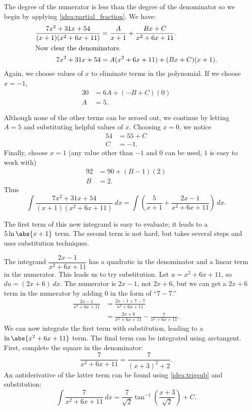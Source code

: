 {The degree of the numerator is less than the degree of the denominator so we begin by applying \autoref{idea:partial_fraction}. We have:
\begin{align*}
\frac{7x^2+31x+54}{(x+1)(x^2+6x+11)} &= \frac{A}{x+1} + \frac{Bx+C}{x^2+6x+11}. \\
\intertext{Now clear the denominators.}
7x^2+31x+54 &= A(x^2+6x+11) + (Bx+C)(x+1).
\end{align*}
Again, we choose values of $x$ to eliminate terms in the polynomial.  If we choose $x=-1$,
\begin{align*}
 30&=6A + (-B+C)(0)\\
 A&= 5.
\end{align*}

Although none of the other terms can be zeroed out, we continue by letting $A=5$ and substituting helpful values of $x$. 
Choosing $x=0$, we notice
\begin{align*}
 54&= 55 +C \\
 C&= -1.
\end{align*}
Finally, choose $x=1$ (any value other than $-1$ and $0$ can be used, $1$ is easy to work with)
\begin{align*}
 92&=90 + (B-1)(2)\\
 B&= 2.
\end{align*}
Thus
\[
 \int\frac{7x^2+31x+54}{(x+1)(x^2+6x+11)}\ dx
 = \int\left(\frac{5}{x+1} + \frac{2x-1}{x^2+6x+11}\right)\ dx.
\]

The first term of this new integrand is easy to evaluate; it leads to a $5\ln\abs{x+1}$ term. The second term is not hard, but takes several steps and uses substitution techniques.

The integrand $\dfrac{2x-1}{x^2+6x+11}$ has a quadratic in the denominator and a linear term in the numerator. This leads us to try substitution. Let $u=x^2+6x+11$, so $du=(2x+6)\ dx$. The numerator is $2x-1$, not $2x+6$, but we can get a $2x+6$ term in the numerator by adding 0 in the form of ``$7-7$.''
\begin{align*}
	\frac{2x-1}{x^2+6x+11} &= \frac{2x-1+7-7}{x^2+6x+11} \\
	&= \frac{2x+6}{x^2+6x+11} - \frac{7}{x^2+6x+11}.
\end{align*}
We can now integrate the first term with substitution, leading to a $\ln\abs{x^2+6x+11}$ term. The final term can be integrated using arctangent. First, complete the square in the denominator:
$$\frac{7}{x^2+6x+11} = \frac{7}{(x+3)^2+2}.$$
An antiderivative of the latter term can be found using \autoref{idea:trigsub} and substitution:
\[
 \int \frac7{x^2+6x+11}\ dx=\frac7{\sqrt2}\tan^{-1}\left(\frac{x+3}{\sqrt2}\right)+C.
\]

}
